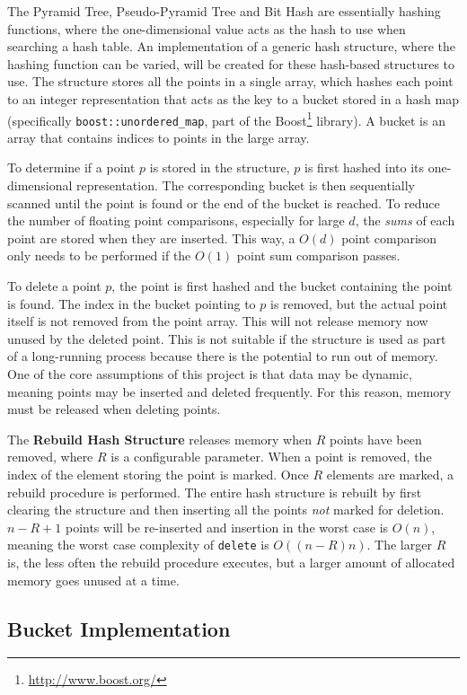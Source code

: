 The Pyramid Tree, Pseudo-Pyramid Tree and Bit Hash are essentially hashing functions, where the one-dimensional value acts as the hash to use when searching a hash table.
An implementation of a generic hash structure, where the hashing function can be varied, will be created for these hash-based structures to use. The structure stores all the points in a single array, which hashes each point to an integer representation that acts as the key to a bucket stored in a hash map (specifically \texttt{boost::unordered\_map}, part of the Boost\footnote{\url{http://www.boost.org/}} library). A bucket is an array that contains indices to points in the large array.

To determine if a point $p$ is stored in the structure, $p$ is first hashed into its one-dimensional representation. The corresponding bucket is then sequentially scanned until the point is found or the end of the bucket is reached. To reduce the number of floating point comparisons, especially for large $d$, the \textit{sums} of each point are stored when they are inserted. This way, a $O(d)$ point comparison only needs to be performed if the $O(1)$ point sum comparison passes.

To delete a point $p$, the point is first hashed and the bucket containing the point is found. The index in the bucket pointing to $p$ is removed, but the actual point itself is not removed from the point array. This will not release memory now unused by the deleted point. This is not suitable if the structure is used as part of a long-running process because there is the potential to run out of memory. One of the core assumptions of this project is that data may be dynamic, meaning points may be inserted and deleted frequently. For this reason, memory must be released when deleting points.

The \textbf{Rebuild Hash Structure} releases memory when $R$ points have been removed, where $R$ is a configurable parameter. When a point is removed, the index of the element storing the point is marked. Once $R$ elements are marked, a rebuild procedure is performed. The entire hash structure is rebuilt by first clearing the structure and then inserting all the points \textit{not} marked for deletion. $n - R + 1$ points will be re-inserted and insertion in the worst case is $O(n)$, meaning the worst case complexity of \texttt{delete} is $O((n - R)n)$. The larger $R$ is, the less often the rebuild procedure executes, but a larger amount of allocated memory goes unused at a time.

\subsection{Bucket Implementation}
\label{sec:bucket-hash-structure}

